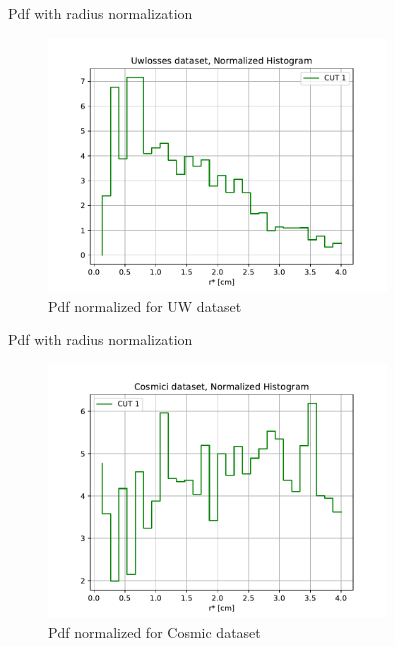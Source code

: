 \documentclass[10pt]{beamer}
\begin{document}
\begin{frame}{Pdf with radius normalization}

\begin{figure}[hbtp]
\centering
\includegraphics[width = 0.8\textwidth]{NormalizedUW.pdf}
\caption{Pdf normalized for UW dataset}
\end{figure}
\end{frame}

\begin{frame}{Pdf with radius normalization}

\begin{figure}[hbtp]
\centering
\includegraphics[width = 0.8\textwidth]{NormalizedBK.pdf}
\caption{Pdf normalized for Cosmic dataset}
\end{figure}
\end{frame}
\end{document}
